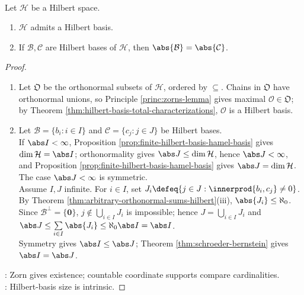 \begin{theorem} \label{thm:hilbert-basis-existence-and-cardinality} \\
Let $\mathcal{H}$ be a Hilbert space.
\begin{enumerate}[label=(\roman*)]
\setlength{\itemsep}{0pt}
\item $\mathcal{H}$ admits a Hilbert basis.
\item If $\mathcal{B},\mathcal{C}$ are Hilbert bases of $\mathcal{H}$, then $\abs{\mathcal{B}}=\abs{\mathcal{C}}$.
\end{enumerate}
\begin{proof}
\begin{enumerate}[label=(\roman*)]
\setlength{\itemsep}{0pt}
\item Let $\mathfrak O$ be the orthonormal subsets of $\mathcal H$, ordered by $\subseteq$. Chains in $\mathfrak O$ have orthonormal unions, so Principle \ref{princ:zorns-lemma} gives maximal $\mathcal O\in\mathfrak O$; by Theorem \ref{thm:hilbert-basis-total-characterizations}, $\mathcal O$ is a Hilbert basis.
\item Let $\mathcal B=\{b_i:i\in I\}$ and $\mathcal C=\{c_j:j\in J\}$ be Hilbert bases.\\
If $\abs I<\infty$, Proposition \ref{prop:finite-hilbert-basis-hamel-basis} gives $\dim\mathcal H=\abs I$; orthonormality gives $\abs J\leq\dim\mathcal H$, hence $\abs J<\infty$, and Proposition \ref{prop:finite-hilbert-basis-hamel-basis} gives $\abs J=\dim\mathcal H$. The case $\abs J<\infty$ is symmetric.\\
Assume $I,J$ infinite. For $i\in I$, set $J_i\defeq\{j\in J:\innerprod{b_i,c_j}\neq0\}$. By Theorem \ref{thm:arbitrary-orthonormal-sums-hilbert}(iii), $\abs{J_i}\leq\aleph_0$.\\
Since $\mathcal B^\perp=\{\mathbf0\}$, $j\notin\bigcup\limits_{i\in I}J_i$ is impossible; hence $J=\bigcup\limits_{i\in I}J_i$ and $\abs J\leq\sum\limits_{i\in I}\abs{J_i}\leq\aleph_0\abs I=\abs I$.\\
Symmetry gives $\abs I\leq\abs J$; Theorem \ref{thm:schroeder-bernstein} gives $\abs I=\abs J$.
\end{enumerate}
: Zorn gives existence; countable coordinate supports compare cardinalities.\\
: Hilbert-basis size is intrinsic.
\end{proof}
\end{theorem}

